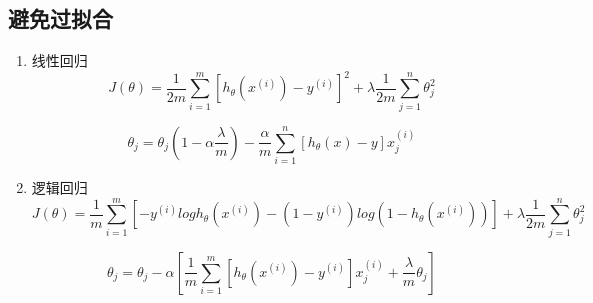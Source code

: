 \subsection{避免过拟合}
\begin{enumerate}
\item 线性回归
\begin{equation}
	J(\theta) = \frac{1}{2m}\sum_{i=1}^m [h_\theta(x^{(i)})-y^{(i)}]^2 + \lambda \frac{1}{2m} \sum_{j=1}^n\theta_j^2
\end{equation}

\begin{equation}
	\theta_j = \theta_j(1-\alpha\frac{\lambda}{m}) - \frac{\alpha}{m}\sum_{i=1}^n\left[h_\theta(x)-y\right]x_j^{(i)}
\end{equation}

\item 逻辑回归
\begin{equation}
	J(\theta) = \frac{1}{m}
	    \sum_{i=1}^m \left[ -y^{(i)}log{h_\theta(x^{(i)})} - (1-y^{(i)})log{(1-h_\theta(x^{(i)}))} \right]
		+ \lambda \frac{1}{2m} \sum_{j=1}^n\theta_j^2
\end{equation}

\begin{equation}
	\theta_j = \theta_j - \alpha \left[\frac{1}{m}\sum_{i=1}^m [h_\theta(x^{(i)})-y^{(i)}]x_j^{(i)} + \frac{\lambda}{m}\theta_j\right]
\end{equation}
\end{enumerate}







